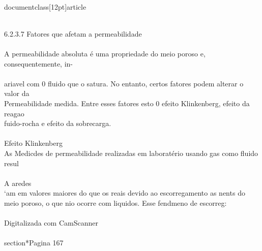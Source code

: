 \\documentclass[12pt]{article}
\begin{document}
\\
6.2.3.7 Fatores que afetam a permeabilidade\\
\\
A permeabilidade absoluta é uma propriedade do meio poroso e, consequentemente, in-\\
\\
ariavel com 0 fluido que o satura. No entanto, certos fatores podem alterar o valor da\\
Permeabilidade medida. Entre esses fatores esto 0 efeito Klinkenberg, efeito da reagao\\
fuido-rocha e efeito da sobrecarga.\\
\\
Efeito Klinkenberg\\
As Medicdes de permeabilidade realizadas em laboratério usando gas como fluido resul\\
\\
A aredes\\
‘am em valores maiores do que os reais devido ao escorregamento as nents do\\
meio poroso, o que nio ocorre com liquidos. Esse fendmeno de escorreg:\\
\\
Digitalizada com CamScanner\\

\\section*{Pagina 167}
\end{document}
